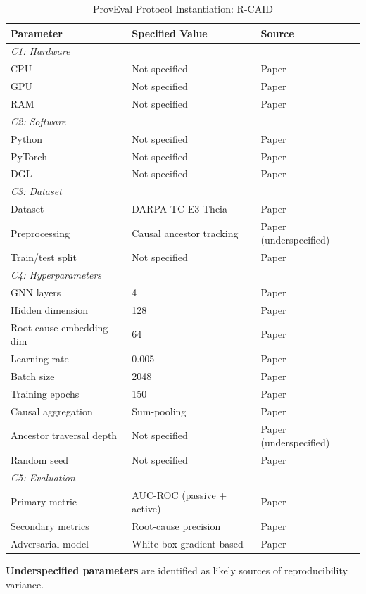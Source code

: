 \documentclass[11pt,a4paper]{article}
\begin{document}
\begin{table}[H]
\centering
\caption{ProvEval Protocol Instantiation: R-CAID}
\label{tab:rcaid-protocol}
\begin{threeparttable}
\begin{tabular}{@{}lll@{}}
\toprule
\textbf{Parameter} & \textbf{Specified Value} & \textbf{Source} \\
\midrule
\multicolumn{3}{l}{\textit{C1: Hardware}} \\
\quad CPU & Not specified & Paper \\
\quad GPU & Not specified & Paper \\
\quad RAM & Not specified & Paper \\
\midrule
\multicolumn{3}{l}{\textit{C2: Software}} \\
\quad Python & Not specified & Paper \\
\quad PyTorch & Not specified & Paper \\
\quad DGL & Not specified & Paper \\
\midrule
\multicolumn{3}{l}{\textit{C3: Dataset}} \\
\quad Dataset & DARPA TC E3-Theia & Paper \\
\quad Preprocessing & Causal ancestor tracking & Paper (underspecified) \\
\quad Train/test split & Not specified & Paper \\
\midrule
\multicolumn{3}{l}{\textit{C4: Hyperparameters}} \\
\quad GNN layers & 4 & Paper \\
\quad Hidden dimension & 128 & Paper \\
\quad Root-cause embedding dim & 64 & Paper \\
\quad Learning rate & 0.005 & Paper \\
\quad Batch size & 2048 & Paper \\
\quad Training epochs & 150 & Paper \\
\quad Causal aggregation & Sum-pooling & Paper \\
\quad Ancestor traversal depth & Not specified & Paper (underspecified) \\
\quad Random seed & Not specified & Paper \\
\midrule
\multicolumn{3}{l}{\textit{C5: Evaluation}} \\
\quad Primary metric & AUC-ROC (passive + active) & Paper \\
\quad Secondary metrics & Root-cause precision & Paper \\
\quad Adversarial model & White-box gradient-based & Paper \\
\bottomrule
\end{tabular}
\begin{tablenotes}
\small
\item \textbf{Underspecified parameters} are identified as likely sources of reproducibility variance.
\end{tablenotes}
\end{threeparttable}
\end{table}
\end{document}
